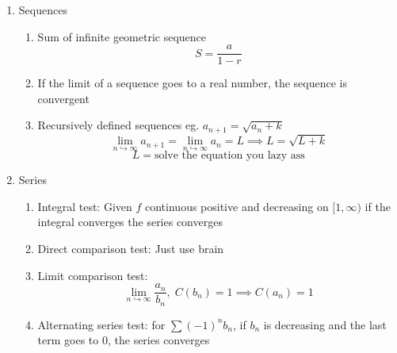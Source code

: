 \documentclass[11pt]{article}
\begin{document}
{\begin{enumerate}
\begin{enumerate}
        \item
        $$\tau=-\frac{d\hat{B}}{ds}\cdot\hat{N(t)}$$
        \item
        $$a=a_T+a_N$$
        \item
        $$a_T=v'=\frac{|r'\cdot r''|}{|r'|}$$
        $$a_N=\kappa v^2=\frac{|r'\times r''|}{|r'|}$$
        \item Equation of Normal Plane at $t$
        \begin{align*}
            r(t)&=<\alpha,\beta,\gamma>\\
            r'(t)&=<a,b,c>\\
            0&=a(x-\alpha)+b(y-\beta)+c(z-\gamma)\\
        \end{align*}
        \item Equation of Oscillating Plane at $t$
        \begin{align*}
            r(t)&=<\alpha,\beta,\gamma>\\
            B(t)&=<a,b,c>\\
            0&=a(x-\alpha)+b(y-\beta)+c(z-\gamma)\\
        \end{align*}
    \end{enumerate}
    \item Sequences
    \begin{enumerate}
        \item Sum of infinite geometric sequence
        $$S=\frac{a}{1-r}$$
        \item If the limit of a sequence goes to a real number, the sequence is convergent 
        \item Recursively defined sequences eg. $a_{n+1}=\sqrt{a_{n}+k}$
        $$\lim_{n\hookrightarrow\infty}a_{n+1}=\lim_{n\hookrightarrow\infty}a_n=L\implies L=\sqrt{L+k}$$
        $$L=\text{solve the equation you lazy ass}$$
    \end{enumerate}
    \item Series
    \begin{enumerate}
        \item Integral test: Given $f$ continuous positive and decreasing on $[1,\infty)$ if the integral converges the series converges
        \item Direct comparison test: Just use brain
        \item Limit comparison test:
        $$\lim_{n\hookrightarrow\infty}\frac{a_n}{b_n},\;C(b_n)=1\implies C(a_n)=1$$
        \item Alternating series test: for $\sum (-1)^n b_n$, if $b_n$ is decreasing and the last term goes to $0$, the series converges

\end{enumerate}
\end{enumerate}}
\end{document}
